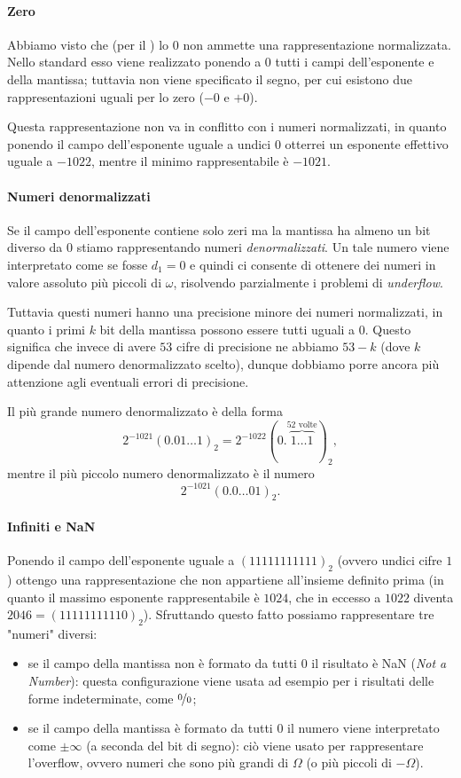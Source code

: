\paragraph{Zero} Abbiamo visto che (per il ) lo $0$ non ammette una rappresentazione normalizzata. Nello standard \IEEE esso viene realizzato ponendo a $0$ tutti i campi dell'esponente e della mantissa; tuttavia non viene specificato il segno, per cui esistono due rappresentazioni uguali per lo zero ($-0$ e $+0$). 

Questa rappresentazione non va in conflitto con i numeri normalizzati, in quanto ponendo il campo dell'esponente uguale a undici $0$ otterrei un esponente effettivo uguale a $-1022$, mentre il minimo rappresentabile è $-1021$. 

\paragraph{Numeri denormalizzati} Se il campo dell'esponente contiene solo zeri ma la mantissa ha almeno un bit diverso da $0$ stiamo rappresentando numeri \emph{denormalizzati}. Un tale numero viene interpretato come se fosse $d_1 = 0$ e quindi ci consente di ottenere dei numeri in valore assoluto più piccoli di $\omega$, risolvendo parzialmente i problemi di \emph{underflow}. 

Tuttavia questi numeri hanno una precisione minore dei numeri normalizzati, in quanto i primi $k$ bit della mantissa possono essere tutti uguali a $0$. Questo significa che invece di avere $53$ cifre di precisione ne abbiamo $53 - k$ (dove $k$ dipende dal numero denormalizzato scelto), dunque dobbiamo porre ancora più attenzione agli eventuali errori di precisione.

Il più grande numero denormalizzato è della forma \[
    2^{-1021} (0.01\dots1)_2 = 2^{-1022} (0.\!\!\overbrace{1\dots1}^{52\text{ volte}})_2,
\] mentre il più piccolo numero denormalizzato è il numero \[
    2^{-1021} (0.0\dots01)_2.
\]

\paragraph{Infiniti e NaN} Ponendo il campo dell'esponente uguale a $(11111111111)_2$ (ovvero undici cifre $1$) ottengo una rappresentazione che non appartiene all'insieme definito prima (in quanto il massimo esponente rappresentabile è $1024$, che in eccesso a $1022$ diventa $2046 = (11111111110)_2$). Sfruttando questo fatto possiamo rappresentare tre "numeri" diversi:
\begin{itemize}
    \item se il campo della mantissa non è formato da tutti $0$ il risultato è NaN (\emph{Not a Number}): questa configurazione viene usata ad esempio per i risultati delle forme indeterminate, come $\nicefrac00$;
    \item se il campo della mantissa è formato da tutti $0$ il numero viene interpretato come $\pm\infty$ (a seconda del bit di segno): ciò viene usato per rappresentare l'overflow, ovvero numeri che sono più grandi di $\Omega$ (o più piccoli di $-\Omega$). 
\end{itemize}